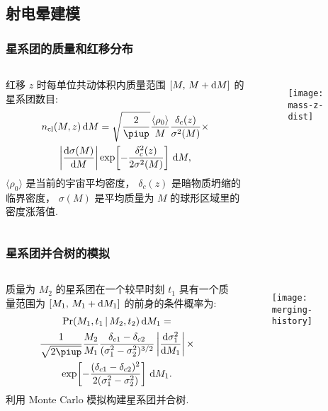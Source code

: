 \documentclass{beamer}
\begin{document}
\subsection{射电晕建模}

\begin{frame}[subsec]
  \frametitle{星系团的质量和红移分布}
  \begin{columns}[onlytextwidth]
    红移 $z$ 时每单位共动体积内质量范围 $[M,\, M+\text{d}M]$ 的星系团数目:
    \begin{multline}
      n_{\R{cl}}(M,z) \,\D{M} =
        \sqrt{\frac{2}{\Cpi}} \frac{\langle \rho_0 \rangle}{M}
        \frac{\delta_c(z)}{\sigma^2(M)} \times \\
        \left| \diff{\sigma(M)}{M} \right|
        \exp\!\left[ -\frac{\delta_c^2(z)}{2\sigma^2(M)} \right]
        \,\D{M} ,
    \end{multline}
    $\langle \rho_0 \rangle$ 是当前的宇宙平均密度，
    $\delta_c(z)$ 是暗物质坍缩的临界密度，
    $\sigma(M)$ 是平均质量为 $M$ 的球形区域里的密度涨落值.

    \begin{figure}
      \centering
      \texttt{[image: mass-z-dist]}
    \end{figure}
  \end{columns}
\end{frame}

\begin{frame}[subsec]
  \frametitle{星系团并合树的模拟}
  \begin{columns}[onlytextwidth]
    质量为 $M_2$ 的星系团在一个较早时刻 $t_1$ 具有一个质量范围为
    $[M_1,\, M_1+\text{d}M_1]$ 的前身的条件概率为:
    \begin{multline}
      \R{Pr}(M_1, t_1 \,|\, M_2, t_2) \,\D{M_1} = \\
        \frac{1}{\sqrt{2\Cpi}} \frac{M_2}{M_1}
        \frac{\delta_{c1} - \delta_{c2}}{(\sigma_1^2 - \sigma_2^2)^{3/2}}
        \left| \diff{\sigma_1^2}{M_1} \right|
        \times \\
        \exp \!\left[ -\frac{(\delta_{c1} - \delta_{c2})^2}
        {2(\sigma_1^2 - \sigma_2^2)} \right] \,\D{M_1} .
    \end{multline}
    利用 Monte Carlo 模拟构建星系团\alert{并合树}.

    \begin{figure}
      \centering
      \texttt{[image: merging-history]}
    \end{figure}
  \end{columns}
\end{frame}
\end{document}
